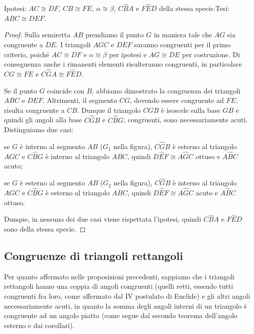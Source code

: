 \noindent Ipotesi: $AC\cong DF$, $CB\cong FE$, $\alpha\cong \beta$, 
$C\widehat{B}A$ e $F\widehat{E}D$ della stessa specie.\tab Tesi: 
$ABC\cong DEF$.


\begin{inaccessibleblock}
 \begin{figure}[htb]
\centering
\end{figure}
\end{inaccessibleblock}

\begin{proof}
Sulla semiretta $AB$ prendiamo il punto $G$ in maniera tale che $AG$ 
sia congruente a $DE$. I triangoli $AGC$ e $DEF$ saranno congruenti 
per il primo criterio, poiché $AC\cong DF$ e $\alpha\cong \beta$ per 
ipotesi e $AG\cong DE$ per costruzione. Di conseguenza anche i 
rimanenti elementi risulteranno congruenti, in particolare $CG\cong 
FE$ e $C\widehat{G}A\cong F\widehat{E}D$.

Se il punto $G$ coincide con $B$, abbiamo dimostrato la congruenza 
dei triangoli $ABC$ e $DEF$. Altrimenti, il segmento $CG$, dovendo 
essere congruente ad $FE$, risulta congruente a $CB$. Dunque il 
triangolo $CGB$ è isoscele sulla base $GB$ e quindi gli angoli alla 
base $C\widehat{G}B$ e $C\widehat{B}G$, congruenti, sono 
necessariamente acuti. Distinguiamo due casi:
\begin{itemize*}
\item se $G$ è interno al segmento $AB$ ($G_1$ nella figura), 
$C\widehat{G}B$ è esterno al triangolo $AGC$ e $C\widehat{B}G$ è 
interno al triangolo $ABC$, quindi $D\widehat{E}F\cong A\widehat{G}C$ 
ottuso e $A\widehat{B}C$ acuto;
\item se $G$ è esterno al segmento $AB$ ($G_2$ nella figura), 
$C\widehat{G}B$ è interno al triangolo $AGC$ e $C\widehat{B}G$ è 
esterno al triangolo $ABC$, quindi $D\widehat{E}F\cong A\widehat{G}C$ 
acuto e $A\widehat{B}C$ ottuso.
\end{itemize*}
Dunque, in nessuno dei due casi viene rispettata l'ipotesi, quindi 
$C\widehat{B}A$ e $F\widehat{E}D$ sono della stessa specie.
\end{proof}

\subsection{Congruenze di triangoli rettangoli}

Per quanto affermato nelle proposizioni precedenti, sappiamo che i 
triangoli rettangoli hanno una coppia di angoli congruenti (quelli 
retti, essendo tutti congruenti fra loro, come affermato dal IV 
postulato di Euclide) e gli altri angoli necessariamente acuti, in 
quanto la somma degli angoli interni di un triangolo è congruente ad 
un angolo piatto (come segue dal secondo teorema dell'angolo esterno 
e dai corollari).

